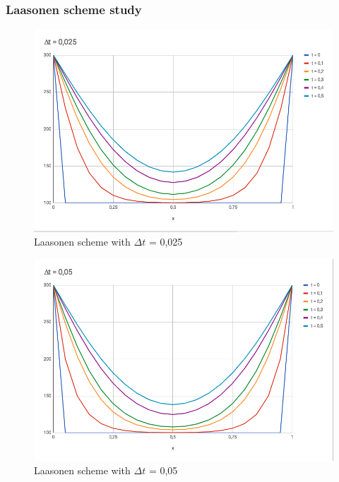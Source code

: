 \documentclass{article}
\begin{document}
            \subsubsection{Laasonen scheme study}
                \begin{figure}[H]
                    \includegraphics[width=\textwidth]{las-2.png}
                    \caption{Laasonen scheme with $\Delta t$ = 0,025}
                \end{figure}
                \begin{figure}[H]
                    \includegraphics[width=\textwidth]{las-3.png}
                    \caption{Laasonen scheme with $\Delta t$ = 0,05}
                \end{figure}
\end{document}
